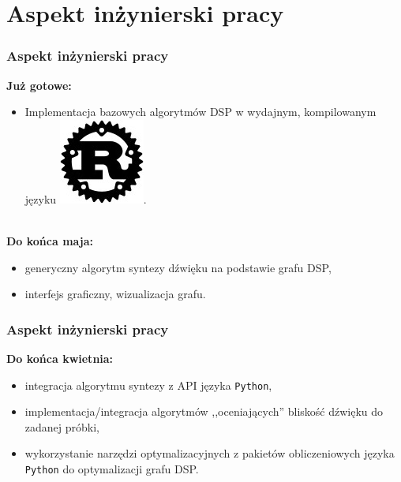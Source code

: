 \documentclass[]{beamer}
\begin{document}
\section{Aspekt inżynierski pracy}
\begin{frame}
  \frametitle{Aspekt inżynierski pracy}

  \textbf{Już gotowe:}
  \begin{itemize}
    \item Implementacja bazowych algorytmów DSP w wydajnym,
      kompilowanym języku \includegraphics[scale=0.45]{rust.jpg}.
  \end{itemize}\\

  \textbf{Do końca maja:}
  \begin{itemize}
    \item generyczny algorytm syntezy dźwięku na podstawie grafu DSP,
    \item interfejs graficzny, wizualizacja grafu.
  \end{itemize}
\end{frame}

\begin{frame}
  \frametitle{Aspekt inżynierski pracy}
  \textbf{Do końca kwietnia:}
  \begin{itemize}
    \item integracja algorytmu syntezy z API języka \texttt{Python},
    \item implementacja/integracja algorytmów ,,oceniających'' bliskość dźwięku do zadanej próbki,
    \item wykorzystanie narzędzi optymalizacyjnych z pakietów obliczeniowych języka \texttt{Python} do optymalizacji grafu DSP.
  \end{itemize}
\end{frame}
\end{document}
